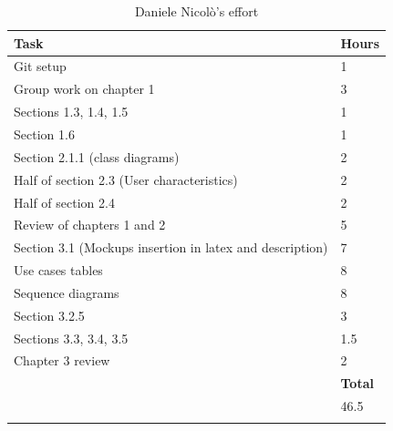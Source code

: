 \documentclass[titlepage]{article}
\begin{document}
	
	
	\begin{longtable}{| p{12 cm} | p{2 cm} |} 
		\hline
		{\bf Task} & {\bf Hours}\\
		\hline
		 Git setup & 1 \\
		 Group work on chapter 1 & 3 \\
		 Sections 1.3, 1.4, 1.5 & 1 \\
		 Section 1.6 & 1 \\
		 Section 2.1.1 (class diagrams) & 2\\ 
		 Half of section 2.3 (User characteristics) & 2 \\
		 Half of section 2.4 & 2 \\
		 Review of chapters 1 and 2 & 5 \\
		 Section 3.1 (Mockups insertion in latex and description) & 7\\
		 Use cases tables & 8 \\
		 Sequence diagrams & 8 \\
		 Section 3.2.5 & 3 \\
		 Sections 3.3, 3.4, 3.5 & 1.5 \\
		 Chapter 3 review & 2 \\
		\hline
		&  {\bf Total} \\
		\hline
		&  46.5 \\
		\hline
		\caption{Daniele Nicolò's effort}
	\end{longtable}
\end{document}
